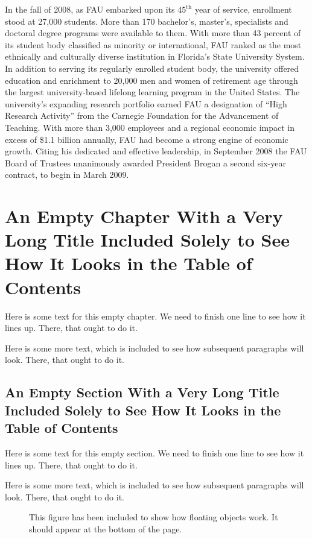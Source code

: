 \documentclass[phd, 12pt, print]{fauthesis}
\begin{document}
In the fall of 2008, as FAU embarked upon its $45^{\mathrm{th}}$ year of service, enrollment stood at 27,000 students.  More than 170 bachelor's, master's, specialists and doctoral degree programs were available to them.  With more than 43 percent of its student body classified as minority or international, FAU ranked as the most ethnically and culturally diverse institution in Florida's State University System.  In addition to serving its regularly enrolled student body, the university offered education and enrichment to 20,000 men and women of retirement age through the largest university-based lifelong learning program in the United States.  The university's expanding research portfolio earned FAU a designation of ``High Research Activity'' from the Carnegie Foundation for the Advancement of Teaching.  With more than 3,000 employees and a regional economic impact in excess of \$1.1 billion annually, FAU had become a strong engine of economic growth.  Citing his dedicated and effective leadership, in September 2008 the FAU Board of Trustees unanimously awarded President Brogan a second six-year contract, to begin in March 2009.


\chapter{An Empty Chapter With a Very Long Title Included Solely to See How It Looks in the Table of Contents}

Here is some text for this empty chapter.  We need to finish one line to see how it lines up.  There, that ought to do it.

Here is some more text, which is included to see how subsequent paragraphs will look.  There, that ought to do it.

\section{An Empty Section With a Very Long Title Included Solely to See How It Looks in the Table of Contents}

Here is some text for this empty section.  We need to finish one line to see how it lines up.  There, that ought to do it.

Here is some more text, which is included to see how subsequent paragraphs will look.  There, that ought to do it.


\begin{figure}[b]
\begin{center}
\parbox{1.0\columnwidth}{\hrulefill{}\quad\hrulefill}
\parbox{0.8\columnwidth}{\hrulefill{}\quad\hrulefill}
\parbox{0.6\columnwidth}{\hrulefill{}\quad\hrulefill}
\parbox{0.4\columnwidth}{\hrulefill{}\quad\hrulefill}
\end{center}
\setlength{}
\caption[A sample figure]{This figure has been included to show how floating objects work.  It should appear at the bottom of the page.}
\end{figure}
\end{document}
